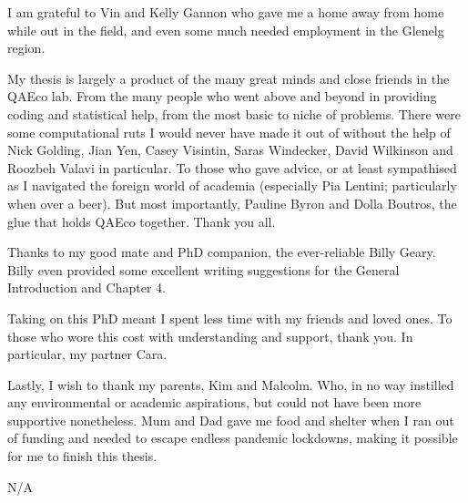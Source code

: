 \documentclass[11pt,a4paper,titlepage,twoside,openright]{style/unimelbthesis}
\begin{document}
\begin{frontmatter}
\begin{acknowledgements}
    I am grateful to Vin and Kelly Gannon who gave me a home away from home while out in the field, and even some much needed employment in the Glenelg region.
    
    My thesis is largely a product of the many great minds and close friends in the QAEco lab. From the many people who went above and beyond in providing coding and statistical help, from the most basic to niche of problems. There were some computational ruts I would never have made it out of without the help of Nick Golding, Jian Yen, Casey Visintin, Saras Windecker, David Wilkinson and Roozbeh Valavi in particular. To those who gave advice, or at least sympathised as I navigated the foreign world of academia (especially Pia Lentini; particularly when over a beer). But most importantly, Pauline Byron and Dolla Boutros, the glue that holds QAEco together. Thank you all.
    
    Thanks to my good mate and PhD companion, the ever-reliable Billy Geary. Billy even provided some excellent writing suggestions for the General Introduction and Chapter 4.
    
    Taking on this PhD meant I spent less time with my friends and loved ones. To those who wore this cost with understanding and support, thank you. In particular, my partner Cara.
    
    Lastly, I wish to thank my parents, Kim and Malcolm. Who, in no way instilled any environmental or academic aspirations, but could not have been more supportive nonetheless. Mum and Dad gave me food and shelter when I ran out of funding and needed to escape endless pandemic lockdowns, making it possible for me to finish this thesis.
  \end{acknowledgements}

  \hypersetup{linkcolor=black}
  \setcounter{tocdepth}{2}
  \tableofcontents


  \listoftables


  \listoffigures

\begin{copyrightlist}
  N/A
\end{copyrightlist}
\end{frontmatter}
%
\end{document}
